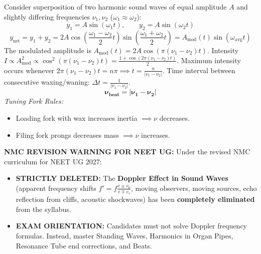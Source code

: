 \documentclass[10pt,a4paper]{article}
\begin{document}
\begin{formulabox}
Consider superposition of two harmonic sound waves of equal amplitude $A$ and slightly differing frequencies $\nu_1, \nu_2$ ($\omega_1 \approx \omega_2$):
\begin{equation}
  y_1 = A\sin(\omega_1 t), \qquad y_2 = A\sin(\omega_2 t)
\end{equation}
\begin{equation}
  y_{\text{net}} = y_1 + y_2 = 2A \cos\left(\frac{\omega_1 - \omega_2}{2}t\right) \sin\left(\frac{\omega_1 + \omega_2}{2}t\right) = A_{\text{mod}}(t) \sin(\omega_{\text{avg}} t)
\end{equation}
The modulated amplitude is $A_{\text{mod}}(t) = 2A \cos(\pi(\nu_1 - \nu_2)t)$.
Intensity $I \propto A_{\text{mod}}^2 \propto \cos^2(\pi(\nu_1 - \nu_2)t) = \frac{1 + \cos(2\pi(\nu_1 - \nu_2)t)}{2}$.
Maximum intensity occurs whenever $2\pi(\nu_1 - \nu_2)t = n\pi \implies t = \frac{n}{|\nu_1 - \nu_2|}$.
Time interval between consecutive waxing/waning: $\Delta t = \frac{1}{|\nu_1 - \nu_2|}$.
\begin{equation}
  \mathbf{\nu_{\text{beat}} = |\nu_1 - \nu_2|}
\end{equation}
\textit{Tuning Fork Rules:}
\begin{itemize}
  \item Loading fork with wax increases inertia $\implies \nu$ decreases.
  \item Filing fork prongs decreases mass $\implies \nu$ increases.
\end{itemize}
\end{formulabox}

\begin{trapbox}
\textbf{NMC REVISION WARNING FOR NEET UG:}
Under the revised NMC curriculum for NEET UG 2027:
\begin{itemize}
  \item \textbf{STRICTLY DELETED:} The \textbf{Doppler Effect in Sound Waves} (apparent frequency shifts $f' = f\frac{v \pm v_0}{v \mp v_s}$, moving observers, moving sources, echo reflection from cliffs, acoustic shockwaves) has been \textbf{completely eliminated} from the syllabus.
  \item \textbf{EXAM ORIENTATION:} Candidates must not solve Doppler frequency formulas. Instead, master Standing Waves, Harmonics in Organ Pipes, Resonance Tube end corrections, and Beats.
\end{itemize}
\end{trapbox}
\end{document}
